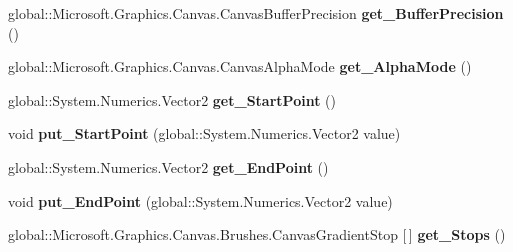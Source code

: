 \begin{DoxyCompactItemize}
global\+::\+Microsoft.\+Graphics.\+Canvas.\+Canvas\+Buffer\+Precision {\bfseries get\+\_\+\+Buffer\+Precision} ()
\item 
\mbox{\label{interface_microsoft_1_1_graphics_1_1_canvas_1_1_brushes_1_1_i_canvas_linear_gradient_brush_a532e44644b9768234226a878bed13561}} 
global\+::\+Microsoft.\+Graphics.\+Canvas.\+Canvas\+Alpha\+Mode {\bfseries get\+\_\+\+Alpha\+Mode} ()
\item 
\mbox{\label{interface_microsoft_1_1_graphics_1_1_canvas_1_1_brushes_1_1_i_canvas_linear_gradient_brush_a4c95714cff8fe9867956a7f25cd99030}} 
global\+::\+System.\+Numerics.\+Vector2 {\bfseries get\+\_\+\+Start\+Point} ()
\item 
\mbox{\label{interface_microsoft_1_1_graphics_1_1_canvas_1_1_brushes_1_1_i_canvas_linear_gradient_brush_a4fde9ab6feb18000a3354b8af87b6090}} 
void {\bfseries put\+\_\+\+Start\+Point} (global\+::\+System.\+Numerics.\+Vector2 value)
\item 
\mbox{\label{interface_microsoft_1_1_graphics_1_1_canvas_1_1_brushes_1_1_i_canvas_linear_gradient_brush_a2b2ca3d763cdba157da6194c916b2f23}} 
global\+::\+System.\+Numerics.\+Vector2 {\bfseries get\+\_\+\+End\+Point} ()
\item 
\mbox{\label{interface_microsoft_1_1_graphics_1_1_canvas_1_1_brushes_1_1_i_canvas_linear_gradient_brush_a30abb12d8a483fb83548dc05572ce0df}} 
void {\bfseries put\+\_\+\+End\+Point} (global\+::\+System.\+Numerics.\+Vector2 value)
\item 
\mbox{\label{interface_microsoft_1_1_graphics_1_1_canvas_1_1_brushes_1_1_i_canvas_linear_gradient_brush_a55f67f2e43ac0e0d8497e485ea121aef}} 
global\+::\+Microsoft.\+Graphics.\+Canvas.\+Brushes.\+Canvas\+Gradient\+Stop \mbox{[}$\,$\mbox{]} {\bfseries get\+\_\+\+Stops} ()

\end{DoxyCompactItemize}
